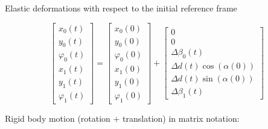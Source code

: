 Elastic deformations with respect to the initial reference frame

\begin{equation}
\renewcommand\arraystretch{1.5}
\begin{bmatrix}
x_0(t) \\
y_0(t) \\
\varphi_0(t) \\
x_1(t) \\
y_1(t) \\
\varphi_1(t)
\end{bmatrix}
=
\begin{bmatrix}
x_0(0) \\
y_0(0) \\
\varphi_0(0) \\
x_1(0) \\
y_1(0) \\
\varphi_1(0)
\end{bmatrix}
+
\begin{bmatrix}
0 \\
0 \\
\Delta\beta_0(t) \\
\Delta d(t) \cos(\alpha(0)) \\
\Delta d(t) \sin(\alpha(0)) \\
\Delta \beta_1(t)
\end{bmatrix}
\end{equation}

\newpage

Rigid body motion (rotation + translation) in matrix notation:

